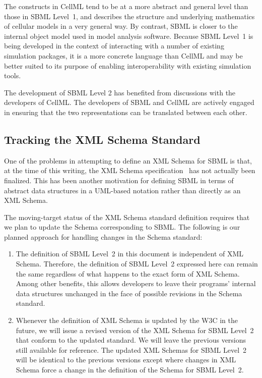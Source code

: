 \documentclass[10pt,twocolumntoc]{cekarticle}
\begin{document}
The constructs in CellML tend to be at a more abstract and general level
than those in SBML Level~1, and describes the structure and underlying
mathematics of cellular models in a very general way.  By contrast, SBML is
closer to the internal object model used in model analysis software.
Because SBML Level~1 is being developed in the context of interacting with
a number of existing simulation packages, it is a more concrete language
than CellML and may be better suited to its purpose of enabling
interoperability with existing simulation tools.

The development of SBML Level 2 has benefited from discussions with the
developers of CellML.  The developers of SBML and CellML are actively
engaged in ensuring that the two representations can be translated between
each other.


\subsection{Tracking the XML Schema Standard}
\label{sec:tracking-xml}

One of the problems in attempting to define an XML Schema for SBML is that,
at the time of this writing, the XML Schema
specification~\citep{biron:2000,thompson:2000} has not actually been
finalized.  This has been another motivation for defining SBML in terms of
abstract data structures in a UML-based notation rather than directly as an
XML Schema.

The moving-target status of the XML Schema standard definition requires
that we plan to update the Schema corresponding to SBML.  The following
is our planned approach for handling changes in the Schema standard:
\begin{enumerate}

\item The definition of SBML Level~2 in this document is
independent of XML
  Schema.  Therefore, the definition of SBML Level~2 expressed here can
  remain the same regardless of what happens to the exact form of XML
  Schema.  Among other benefits, this allows developers to leave their
  programs' internal data structures unchanged in the face of possible
  revisions in the Schema standard.

%
\item Whenever the definition of XML Schema is updated by the W3C in the
  future, we will issue a revised version of the XML Schema for SBML
  Level~2 that conform to the updated standard.  We will leave the previous
  versions still available for reference.  The updated XML Schemas for SBML
  Level~2 will be identical to the previous versions except where changes
  in XML Schema force a change in the definition of the Schema for SBML
  Level~2.

\end{enumerate}
\end{document}
